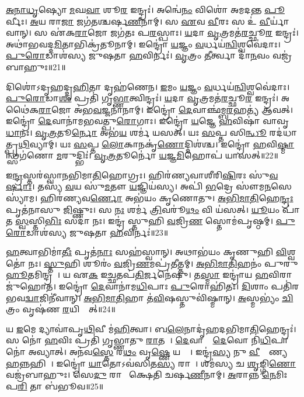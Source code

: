 \ul{𑌅}\ul{𑌨𑌾}\ul{𑌧𑍃}𑌷𑍍𑌯𑍋 \ul{𑌮}𑌘\ul{𑌵𑌾} 𑌶𑍂\ul{𑌰} 𑌇𑌨𑍍𑌦𑍍𑌰𑌃॑।
𑌅𑌨𑍍𑌵𑍇॑\ul{𑌨𑌂} 𑌵𑌿𑌶𑍋॑ 𑌅𑌮𑌦𑌨𑍍𑌤 \ul{𑌪𑍂}𑌰𑍍𑌵𑍀𑌃।
\ul{𑌅}𑌯 𑌰𑌾\ul{𑌜𑌾} 𑌜𑌗॑𑌤𑌶𑍍𑌚𑌰𑍍\mbox{}𑌷\ul{𑌣𑍀}𑌨𑌾𑌮𑍍।
𑌸 \ul{𑌏}𑌵 \ul{𑌵𑍀}𑌰𑌃 𑌸 𑌉॑ \ul{𑌵𑍀}𑌰𑍍𑌯𑌾॑𑌵𑌾𑌨𑍍।
𑌸 𑌏॑𑌕\ul{𑌰𑌾}𑌜𑍋 𑌜𑌗॑𑌤𑌃 𑌪\ul{𑌰}𑌸𑍍𑌪𑌾𑌃।
\ul{𑌯}𑌦𑌾 \ul{𑌵𑍃}𑌤𑍍𑌰𑌮𑌤॑\ul{𑌰}𑌚𑍍𑌛𑍂\ul{𑌰} 𑌇𑌨𑍍𑌦𑍍𑌰𑌃॑।
𑌅𑌥𑌾॑𑌭𑌵𑌦𑍍𑌦\ul{𑌮𑌿}𑌤𑌾𑌭𑌿𑌕𑍍𑌰॑𑌤𑍂𑌨𑌾𑌮𑍍।
𑌇𑌨𑍍𑌦𑍍𑌰𑍋॑ \ul{𑌯}𑌜𑍍𑌞𑌂 \ul{𑌵}𑌰𑍍𑌧𑌯॑\ul{𑌨𑍍𑌵𑌿}𑌶𑍍𑌵𑌵𑍇॑𑌦𑌾𑌃।
\ul{𑌪𑍁}\ul{𑌰𑍋}𑌡𑌾𑌶॑𑌸𑍍𑌯 𑌜𑍁𑌷𑌤𑌾 \ul{𑌹}𑌵𑌿𑌰𑍍𑌨𑌃॑।
\ul{𑌵𑍃}𑌤𑍍𑌰𑌂 \ul{𑌤𑍀}𑌰𑍍𑌤𑍍𑌵𑌾 𑌦𑌾॑\ul{𑌨}𑌵𑌂 𑌵𑌜𑍍𑌰॑𑌬𑌾𑌹𑍁𑌃॥21॥

𑌦𑌿𑌶𑍋॑\-𑌽𑌦𑍃𑌹𑌦𑍍𑌦𑍃\ul{𑌹𑌿}𑌤𑌾 𑌦𑍃𑌹॑𑌣𑍇𑌨।
\ul{𑌇}𑌮𑌂 \ul{𑌯}𑌜𑍍𑌞𑌂 \ul{𑌵}𑌰𑍍𑌧𑌯॑\ul{𑌨𑍍𑌵𑌿}𑌶𑍍𑌵\-𑌵𑍇॑𑌦𑌾𑌃।
\ul{𑌪𑍁}\ul{𑌰𑍋}𑌡𑌾\ul{𑌶𑌂} 𑌪𑍍𑌰𑌤𑌿॑ 𑌗𑍃\ul{𑌭𑍍𑌣𑌾}𑌤𑍍𑌵𑌿𑌨𑍍𑌦𑍍𑌰𑌃॑।
\ul{𑌯}𑌦𑌾 \ul{𑌵𑍃}𑌤𑍍𑌰𑌮𑌤॑\ul{𑌰}𑌚𑍍𑌛𑍂\ul{𑌰} 𑌇𑌨𑍍𑌦𑍍𑌰𑌃॑।
𑌅𑌥𑍈॑𑌕\ul{𑌰𑌾}𑌜𑍋 𑌅॑𑌭\ul{𑌵}𑌜𑍍𑌜𑌨𑌾॑𑌨𑌾𑌮𑍍।
𑌇𑌨𑍍𑌦𑍍𑌰𑍋॑ \ul{𑌦𑍇}𑌵𑌾𑌞𑍍𑌛॑𑌮𑍍𑌬\ul{𑌰}𑌹𑌤𑍍𑌯॑ 𑌆𑌵𑌤𑍍।
𑌇𑌨𑍍𑌦𑍍𑌰𑍋॑ \ul{𑌦𑍇}𑌵𑌾𑌨𑌾॑𑌮𑌭𑌵𑌤𑍍𑌪𑍁\ul{𑌰𑍋}𑌗𑌾𑌃।
𑌇𑌨𑍍𑌦𑍍𑌰𑍋॑ \ul{𑌯}𑌜𑍍𑌞𑍇 \ul{𑌹}𑌵𑌿𑌷𑌾॑ 𑌵𑌾𑌵𑍃\ul{𑌧𑌾}𑌨𑌃।
\ul{𑌵𑍃}\ul{𑌤𑍍𑌰}𑌤𑍂\ul{𑌰𑍍𑌨𑍋} 𑌅𑌭॑\ul{𑌯}\ul{} 𑌶𑌰𑍍𑌮॑ 𑌯𑌸𑌤𑍍।
𑌯𑌃 \ul{𑌸}𑌪𑍍𑌤 𑌸𑌿\ul{𑌨𑍍𑌧𑍂}\ul{} 𑌰𑌦॑𑌧𑌾𑌤𑍍𑌪𑍃\ul{𑌥𑌿}𑌵𑍍𑌯𑌾𑌮𑍍।
𑌯𑌃 \ul{𑌸}𑌪𑍍𑌤 \ul{𑌲𑍋}𑌕𑌾𑌨𑌕𑍃॑\ul{𑌣𑍋}𑌦𑍍𑌦𑌿𑌶॑𑌶𑍍𑌚।
𑌇𑌨𑍍𑌦𑍍𑌰𑍋॑ \ul{𑌹}𑌵𑌿\ul{𑌷𑍍𑌮𑌾}𑌨𑍍𑌥𑍍𑌸𑌗॑𑌣𑍋 \ul{𑌮}𑌰𑍁𑌦𑍍𑌭𑌿𑌃॑।
\ul{𑌵𑍃}\ul{𑌤𑍍𑌰}𑌤𑍂𑌰𑍍𑌨𑍋॑ \ul{𑌯}𑌜𑍍𑌞\ul{𑌮𑌿}𑌹𑍋𑌪॑ 𑌯𑌾𑌸𑌤𑍍॥22॥\anuvakamend[\ul{𑌵}\ul{𑌵}\ul{𑌰𑍍𑌥} \ul{𑌵𑌿}\ul{𑌥𑍍𑌸} 𑌇𑌨𑍍𑌦𑍍𑌰॑\ul{𑌸𑍍𑌤𑍁}𑌰𑌾𑌯𑌾᳚𑌸𑍍𑌤𑍁 𑌵𑍃\ul{𑌤𑍍𑌰}𑌤𑍂\ul{𑌰𑍍𑌯𑍇} 𑌵𑌜𑍍𑌰॑𑌬𑌾𑌹𑍁𑌃 𑌪𑍃\ul{𑌥𑌿}𑌵𑍍𑌯𑌾𑌨𑍍𑌤𑍍𑌰𑍀𑌣𑌿॑ 𑌚]

𑌇\ul{𑌨𑍍𑌦𑍍𑌰}𑌸𑍍𑌤𑌰॑𑌸𑍍𑌵𑌾𑌨𑌭𑌿𑌮𑌾\ul{𑌤𑌿}𑌹𑍋𑌗𑍍𑌰𑌃।
𑌹𑌿𑌰॑𑌣𑍍𑌯𑌵𑌾𑌶𑍀𑌰𑌿\ul{𑌷𑌿}𑌰𑌃 𑌸𑍁॑\ul{𑌵}\ul{𑌰𑍍}𑌷𑌾𑌃।
𑌤𑌸𑍍𑌯॑ \ul{𑌵}𑌯 𑌸𑍁॑\ul{𑌮}𑌤𑍗 \ul{𑌯}𑌜𑍍𑌞𑌿𑌯॑𑌸𑍍𑌯।
𑌅𑌪𑌿॑ \ul{𑌭}𑌦𑍍𑌰𑍇 𑌸𑍗॑𑌮\ul{𑌨}𑌸𑍇 𑌸𑍍𑌯𑌾॑𑌮।
𑌹𑌿𑌰॑𑌣𑍍𑌯𑌵\ul{𑌰𑍍𑌣𑍋} 𑌅𑌭॑𑌯𑌂 𑌕𑍃𑌣𑍋𑌤𑍁।
\ul{𑌅}\ul{𑌭𑌿}\ul{𑌮𑌾}\ul{𑌤𑌿}𑌹𑍇\ul{𑌨𑍍𑌦𑍍𑌰𑌃} 𑌪𑍃𑌤॑𑌨𑌾𑌸𑍁 \ul{𑌜𑌿}𑌷𑍍𑌣𑍁𑌃।
𑌸 \ul{𑌨𑌃} 𑌶𑌰𑍍𑌮॑ \ul{𑌤𑍍𑌰𑌿}𑌵𑌰𑍂॑\ul{𑌥𑌂} 𑌵𑌿 𑌯॑𑌸𑌤𑍍।
\ul{𑌯𑍂}𑌯𑌂 𑌪𑌾॑𑌤 \ul{𑌸𑍍𑌵}𑌸𑍍𑌤𑌿\ul{𑌭𑌿𑌃} 𑌸𑌦𑌾॑ 𑌨𑌃।
𑌇𑌨𑍍𑌦𑍍𑌰॑ 𑌸𑍍𑌤𑍁𑌹𑌿 \ul{𑌵}𑌜𑍍𑌰𑌿\ul{𑌣}\ul{} 𑌸𑍍𑌤𑍋𑌮॑𑌪𑍃𑌷𑍍𑌠𑌮𑍍।
\ul{𑌪𑍁}\ul{𑌰𑍋}𑌡𑌾𑌶॑𑌸𑍍𑌯 𑌜𑍁𑌷𑌤𑌾 \ul{𑌹}𑌵𑌿𑌰𑍍𑌨𑌃॑॥23॥

\ul{𑌹}𑌤𑍍𑌵𑌾𑌭𑌿𑌮𑌾॑\ul{𑌤𑍀𑌃} 𑌪𑍃𑌤॑\ul{𑌨𑌾𑌃} 𑌸𑌹॑𑌸𑍍𑌵𑌾𑌨𑍍।
𑌅𑌥𑌾𑌭॑𑌯𑌂 𑌕𑍃𑌣𑍁𑌹𑌿 \ul{𑌵𑌿}𑌶𑍍𑌵𑌤𑍋॑ 𑌨𑌃।
\ul{𑌸𑍍𑌤𑍁}𑌹𑌿 𑌶𑍂𑌰𑌂॑ \ul{𑌵}𑌜𑍍𑌰𑌿\ul{𑌣}𑌮𑌪𑍍𑌰॑𑌤𑍀𑌤𑍍𑌤𑌮𑍍।
\ul{𑌅}\ul{𑌭𑌿}\ul{𑌮𑌾}\ul{𑌤𑌿}𑌹𑌨𑌂॑ 𑌪𑍁𑌰𑍁\ul{𑌹𑍂}𑌤𑌮𑌿𑌨𑍍𑌦𑍍𑌰𑌮𑍍᳚।
𑌯 𑌏\ul{𑌕} 𑌇\ul{𑌚𑍍𑌛}𑌤𑌪॑\ul{𑌤𑌿}𑌰𑍍𑌜𑌨𑍇॑𑌷𑍁।
𑌤\ul{𑌸𑍍𑌮𑌾} 𑌇𑌨𑍍𑌦𑍍𑌰𑌾॑𑌯 \ul{𑌹}𑌵𑌿𑌰𑌾 𑌜𑍁॑𑌹𑍋𑌤।
𑌇𑌨𑍍𑌦𑍍𑌰𑍋॑ \ul{𑌦𑍇}𑌵𑌾𑌨𑌾॑𑌮\ul{𑌧𑌿}𑌪𑌾𑌃 \ul{𑌪𑍁}𑌰𑍋𑌹𑌿॑𑌤𑌃।
\ul{𑌦𑌿}𑌶𑌾𑌂 𑌪𑌤𑌿॑𑌰𑌭𑌵\ul{𑌦𑍍𑌵𑌾}𑌜𑌿𑌨𑍀॑𑌵𑌾𑌨𑍍।
\ul{𑌅}\ul{𑌭𑌿}\ul{𑌮𑌾}\ul{𑌤𑌿}𑌹𑌾 𑌤॑\ul{𑌵𑌿}𑌷𑌸𑍍𑌤𑍁𑌵𑌿॑𑌷𑍍𑌮𑌾𑌨𑍍।
\ul{𑌅}𑌸𑍍𑌮𑌭𑍍𑌯𑌂॑ \ul{𑌚𑌿}𑌤𑍍𑌰𑌂 𑌵𑍃𑌷॑𑌣 \ul{𑌰}𑌯𑌿𑌨𑍍𑌦𑌾᳚𑌤𑍍॥24॥

𑌯 \ul{𑌇}𑌮𑍇 𑌦𑍍𑌯𑌾𑌵𑌾॑𑌪𑍃\ul{𑌥𑌿}𑌵𑍀 𑌮॑\ul{𑌹𑌿}𑌤𑍍𑌵𑌾।
𑌬\ul{𑌲𑍇}𑌨𑌾𑌦𑍃॑𑌹𑌦𑌭𑌿𑌮𑌾\ul{𑌤𑌿}𑌹𑍇𑌨𑍍𑌦𑍍𑌰𑌃॑।
𑌸 𑌨𑍋॑ \ul{𑌹}𑌵𑌿𑌃 𑌪𑍍𑌰𑌤𑌿॑ 𑌗𑍃𑌭𑍍𑌣𑌾𑌤𑍁 \ul{𑌰𑌾}𑌤𑌯𑍇᳚।
\ul{𑌦𑍇}𑌵𑌾𑌨𑌾𑌂᳚ \ul{𑌦𑍇}𑌵𑍋 𑌨𑌿॑\ul{𑌧𑌿}𑌪𑌾 𑌨𑍋॑ 𑌅𑌵𑍍𑌯𑌾𑌤𑍍।
𑌅𑌨॑𑌵\ul{𑌸𑍍𑌤𑍇} 𑌰\ul{𑌥𑌂} 𑌵𑍃\ul{𑌷𑍍𑌣𑍇} 𑌯𑌤𑍍𑌤𑍇᳚।
𑌇𑌨𑍍𑌦𑍍𑌰॑\ul{𑌸𑍍𑌯} 𑌨𑍁 \ul{𑌵𑍀}𑌰𑍍𑌯𑌾᳚𑌣𑍍𑌯\ul{𑌹}𑌨𑍍𑌨𑌹𑌿𑌮𑍍᳚।
𑌇𑌨𑍍𑌦𑍍𑌰𑍋॑ \ul{𑌯𑌾}𑌤𑍋\-𑌽𑌵॑𑌸𑌿𑌤\ul{𑌸𑍍𑌯} 𑌰𑌾𑌜𑌾᳚।
𑌶𑌮॑𑌸𑍍𑌯 𑌚 \ul{𑌶𑍃}𑌙𑍍𑌗𑌿\ul{𑌣𑍋} 𑌵𑌜𑍍𑌰॑𑌬𑌾𑌹𑍁𑌃।
𑌸𑍇\ul{𑌦𑍁} 𑌰𑌾𑌜𑌾᳚ 𑌕𑍍𑌷𑍇𑌤𑌿 𑌚𑌰𑍍\mbox{}𑌷\ul{𑌣𑍀}𑌨𑌾𑌮𑍍।
\ul{𑌅}𑌰𑌾𑌨𑍍𑌨 \ul{𑌨𑍇}𑌮𑌿𑌃 𑌪\ul{𑌰𑌿} 𑌤𑌾 𑌬॑𑌭𑍂𑌵॥25॥

